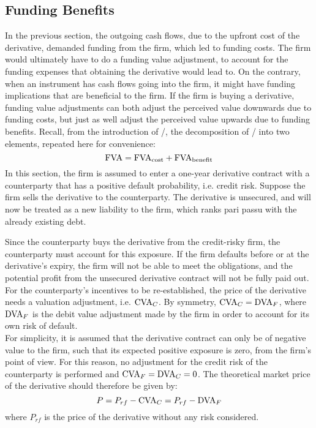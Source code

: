 \documentclass[../main.tex]{subfiles}
\begin{document}
    \subsection{Funding Benefits}
    \label{sec:example-funding-benefit}
        In the previous section, 
        the outgoing cash flows, due to the upfront cost of the derivative,
        demanded funding from the firm, which led to funding costs. 
        The firm would ultimately have to do a funding value adjustment,
        to account for the funding expenses that obtaining the derivative would lead to.
        On the contrary, when an instrument has cash flows going into the firm,
        it might have funding implications that are beneficial to the firm.
        If the firm is buying a derivative,
        funding value adjustments can both adjust the perceived value downwards due to funding costs,
        but just as well adjust the perceived value upwards due to funding benefits.
        Recall, from the introduction of \FVA/, the decomposition of \FVA/ into two elements,
        repeated here for convenience:
        \begin{equation}
            \FVA/ = \FCA/ + \FBA/
        \end{equation}
        In this section, the firm is assumed to enter a one-year derivative contract 
        with a counterparty that has a positive default probability, i.e. credit risk.
        Suppose the firm sells the derivative to the counterparty. 
        The derivative is unsecured, and will now be treated as a new liability to the firm, 
        which ranks pari passu with the already existing debt.

        Since the counterparty buys the derivative from the credit-risky firm, 
        the counterparty must account for this exposure. 
        If the firm defaults before or at the derivative's expiry, the firm will not be able to meet the obligations, 
        and the potential profit from the unsecured derivative contract will not be fully paid out. 
        For the counterparty's incentives to be re-established, 
        the price of the derivative needs a valuation adjustment, i.e. $\CVA/_C$. 
        By symmetry, $\CVA/_C = \DVA/_F$, 
        where $\DVA/_F$ is the debit value adjustment made by the firm 
        in order to account for its own risk of default.\\
        For simplicity, it is assumed that the derivative contract 
        can only be of negative value to the firm, 
        such that its expected positive exposure is zero, from the firm's point of view.
        For this reason, no adjustment for the credit risk of the counterparty is performed and 
        $\CVA/_F = \DVA/_C = 0$.
        The theoretical market price of the derivative should therefore be given by:
        \begin{equation}\label{eqn:option-value-credit-risk}
            P = P_{rf} - \CVA/_C = P_{rf} - \DVA/_F
        \end{equation}
        where $P_{rf}$ is the price of the derivative without any risk considered.
\end{document}
